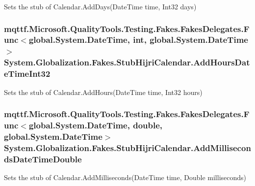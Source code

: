 Sets the stub of Calendar.\-Add\-Days(\-Date\-Time time, Int32 days)

\hypertarget{class_system_1_1_globalization_1_1_fakes_1_1_stub_hijri_calendar_a62d42cb545edac1ce540665118991d60}{
\subsubsection[{Add\-Hours\-Date\-Time\-Int32}]{\setlength{\rightskip}{0pt plus 5cm}mqttf.\-Microsoft.\-Quality\-Tools.\-Testing.\-Fakes.\-Fakes\-Delegates.\-Func$<$global.\-System.\-Date\-Time, int, global.\-System.\-Date\-Time$>$ System.\-Globalization.\-Fakes.\-Stub\-Hijri\-Calendar.\-Add\-Hours\-Date\-Time\-Int32}}\label{class_system_1_1_globalization_1_1_fakes_1_1_stub_hijri_calendar_a62d42cb545edac1ce540665118991d60}


Sets the stub of Calendar.\-Add\-Hours(\-Date\-Time time, Int32 hours)

\hypertarget{class_system_1_1_globalization_1_1_fakes_1_1_stub_hijri_calendar_aa5281db9ab06c76794a3b92eafda6b43}{
\subsubsection[{Add\-Milliseconds\-Date\-Time\-Double}]{\setlength{\rightskip}{0pt plus 5cm}mqttf.\-Microsoft.\-Quality\-Tools.\-Testing.\-Fakes.\-Fakes\-Delegates.\-Func$<$global.\-System.\-Date\-Time, double, global.\-System.\-Date\-Time$>$ System.\-Globalization.\-Fakes.\-Stub\-Hijri\-Calendar.\-Add\-Milliseconds\-Date\-Time\-Double}}\label{class_system_1_1_globalization_1_1_fakes_1_1_stub_hijri_calendar_aa5281db9ab06c76794a3b92eafda6b43}


Sets the stub of Calendar.\-Add\-Milliseconds(\-Date\-Time time, Double milliseconds)

